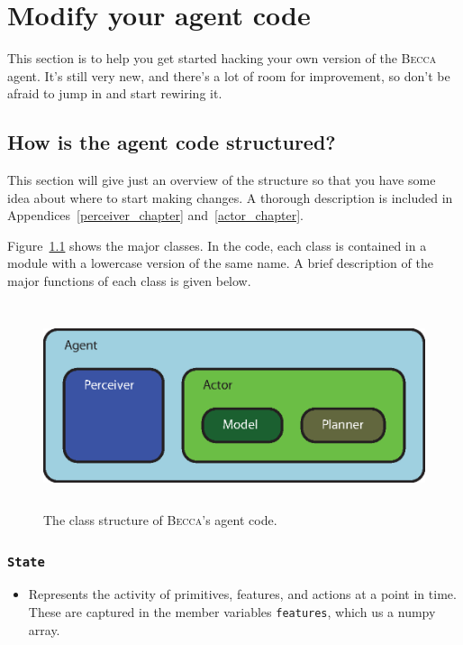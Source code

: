 \chapter{Modify your agent code}

This section is to help you get started hacking your own version of the \textsc{Becca} agent. It's still very new, and there's a lot of room for improvement, so don't be afraid to jump in and start rewiring it.

\section{How is the agent code structured?}

This section will give just an overview of the structure so that you have some idea about where to start making changes. A thorough description is included in Appendices~\ref{perceiver_chapter} and~\ref{actor_chapter}. 

Figure~\ref{class_structure} shows the major classes. In the code, each class is contained in a module with a lowercase version of the same name. A brief description of the major functions of each class is given below.

\begin{figure}
\centering
\includegraphics[height=6cm]{figs/class_structure.eps}
\caption{The class structure of \textsc{Becca}'s agent code.}
\label{class_structure}
\end{figure}

\subsection{\texttt{State}}
\begin{itemize}
\item Represents the activity of primitives, features, and actions at a point in time. These are captured in the member variables \texttt{features}, which us a numpy array. 
\end{itemize}

